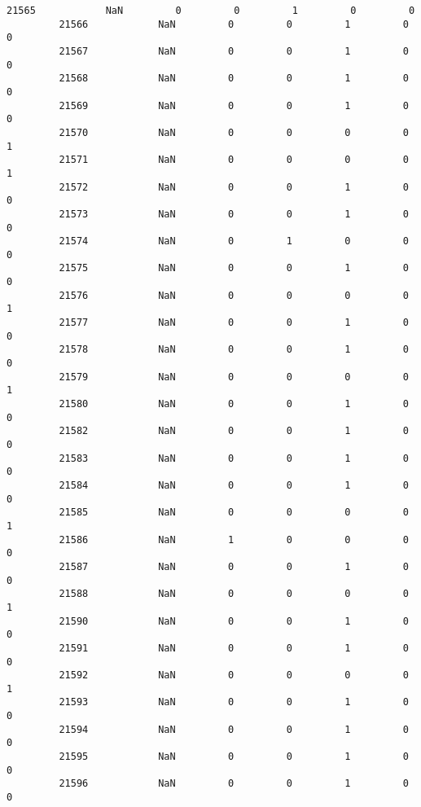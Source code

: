 \documentclass[11pt]{article}
\begin{document}
\begin{Verbatim}[commandchars=\\\{\}]
         21565            NaN         0         0         1         0         0   
         21566            NaN         0         0         1         0         0   
         21567            NaN         0         0         1         0         0   
         21568            NaN         0         0         1         0         0   
         21569            NaN         0         0         1         0         0   
         21570            NaN         0         0         0         0         1   
         21571            NaN         0         0         0         0         1   
         21572            NaN         0         0         1         0         0   
         21573            NaN         0         0         1         0         0   
         21574            NaN         0         1         0         0         0   
         21575            NaN         0         0         1         0         0   
         21576            NaN         0         0         0         0         1   
         21577            NaN         0         0         1         0         0   
         21578            NaN         0         0         1         0         0   
         21579            NaN         0         0         0         0         1   
         21580            NaN         0         0         1         0         0   
         21582            NaN         0         0         1         0         0   
         21583            NaN         0         0         1         0         0   
         21584            NaN         0         0         1         0         0   
         21585            NaN         0         0         0         0         1   
         21586            NaN         1         0         0         0         0   
         21587            NaN         0         0         1         0         0   
         21588            NaN         0         0         0         0         1   
         21590            NaN         0         0         1         0         0   
         21591            NaN         0         0         1         0         0   
         21592            NaN         0         0         0         0         1   
         21593            NaN         0         0         1         0         0   
         21594            NaN         0         0         1         0         0   
         21595            NaN         0         0         1         0         0   
         21596            NaN         0         0         1         0         0   
         

\end{Verbatim}
\end{document}
